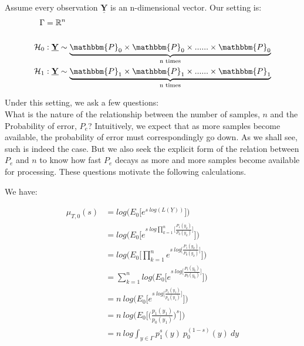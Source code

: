 \documentclass[12pt]{report}
\begin{document}
Assume every observation $\underline{\mathbf{Y}}$ is an n-dimensional vector. Our setting is:
         \begin{align*}
              \Gamma &= \mathbb{R}^n\\\\
              \mathcal{H}_0&:   \underline{\mathbf{Y}} \sim \underbrace{\mathbbm{P}_0 \times  \mathbbm{P}_0 \times ......  \times \mathbbm{P}_0}_\text{n times} \\
             \mathcal{H}_1&:   \underline{\mathbf{Y}} \sim \underbrace{\mathbbm{P}_1 \times  \mathbbm{P}_1 \times ......  \times \mathbbm{P}_1}_\text{n times} \\
         \end{align*}

\noindent Under this setting, we ask a few questions: \\
What is the nature of the relationship between the number of samples, $n$ and the Probability of error, $P_e$? 
Intuitively, we expect that as more samples become available, the probability of error must correspondingly go down. 
As we shall see, such  is indeed the case. But we also seek the explicit form of the relation between $P_e$ and $n$ to know how fast $P_e$ decays as more and more samples become available for processing.
These questions motivate the following calculations. \\

\newpage

\noindent We have:

              \begin{equation}
              \begin{aligned}
                     \mu_{T,0}(s) &=  log\Big(E_0 \Big[e^{s \: log(L(\underline{Y})  ) } \Big] \Big)  \\
                                           &=  log\Big(E_0 \Big[e^{s \: log \prod_{k=1}^{n} \big[\frac{P_1(y_k)}{P_0(y_k)}\big]  } \Big] \Big)  \\
                                           &=  log\Big( E_0 \Big[ \prod_{k=1}^{n}  e^{s \:  log \big[ \frac{P_1(y_k)}{P_0(y_k)}\big] } \Big] \Big)   \\
                                           &= \sum_{k=1}^{n} log \Big( E_0 \Big[   e^{s \: log \big[ \frac{P_1(y_k)}{P_0(y_k)}   \big]  }    \Big] \Big)  \\
                                           &= n \: log \Big( E_0 \Big[  e^{s \: log \big[\frac{ p_1(y_1)}{ p_0(y_1)} \big]}  \Big] \Big)  \\
                                           &= n \: log \Big(  E_0\Big[ \Big( \frac{ p_1(y_1)}{ p_0(y_1)} \Big)^{s}  \Big] \Big)    \\
                                           &= n \: log  \int_{y \in \Gamma} p_1^{s}(y) \: p_0^{(1-s)}(y) \: dy\\\\
              \end{aligned}
              \end{equation}
\end{document}
